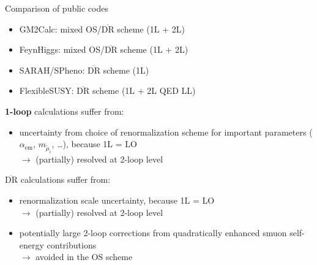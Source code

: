 \documentclass[hyperref={pdfpagelabels=false},ngerman]{beamer}
\renewcommand{\emph}{\textbf}
\newcommand{\DRbar}{\ensuremath{\overline{\text{DR}}}\xspace}
\begin{document}
\begin{frame}{Comparison of public codes}
  \begin{itemize}
  \item GM2Calc: mixed OS/\DRbar scheme (1L + 2L)
  \item FeynHiggs: mixed OS/\DRbar scheme (1L + 2L)
  \item SARAH/SPheno: \DRbar scheme (1L)
  \item FlexibleSUSY: \DRbar scheme (1L + 2L QED LL)
  \end{itemize}
  \vspace{1em}
  \emph{1-loop} calculations suffer from:
  \begin{itemize}
  \item uncertainty from choice of renormalization scheme for
    important parameters ($\alpha_{\text{em}}$, $m_{\tilde{\mu}_i}$,
    \ldots), because 1L = LO\\
    $\rightarrow$ (partially) resolved at 2-loop level
  \end{itemize}
  \vspace{1em}
  \emph{\DRbar} calculations suffer from:
  \begin{itemize}
  \item renormalization scale uncertainty, because 1L = LO\\
    $\rightarrow$ (partially) resolved at 2-loop level
  \item potentially large 2-loop corrections from quadratically
    enhanced smuon self-energy contributions\\
    $\rightarrow$ avoided in the OS scheme
  \end{itemize}
\end{frame}
\end{document}

